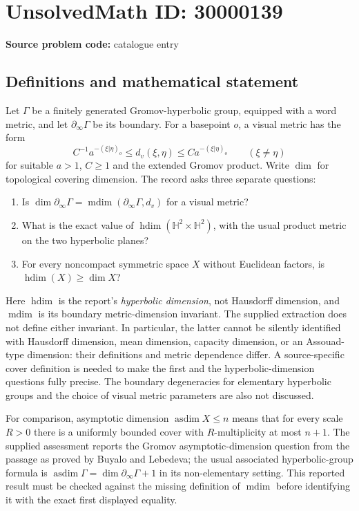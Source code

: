 \documentclass[11pt]{article}
\begin{document}
\section*{UnsolvedMath ID: 30000139}
\textbf{Source problem code:} catalogue entry
\subsection{Definitions and mathematical statement}
Let $\Gamma$ be a finitely generated Gromov-hyperbolic group, equipped with a word metric, and let $\partial_\infty\Gamma$ be its boundary. For a basepoint $o$, a visual metric has the form
\[
 C^{-1}a^{-(\xi|\eta)_o}\leq d_v(\xi,\eta)
       \leq Ca^{-(\xi|\eta)_o}\qquad(\xi\ne\eta)
\]
for suitable $a>1$, $C\geq1$ and the extended Gromov product. Write $\dim$ for topological covering dimension. The record asks three separate questions:
\begin{enumerate}
\item Is $\dim\partial_\infty\Gamma=\operatorname{mdim}(\partial_\infty\Gamma,d_v)$ for a visual metric?
\item What is the exact value of $\operatorname{hdim}(\mathbb H^2\times\mathbb H^2)$, with the usual product metric on the two hyperbolic planes?
\item For every noncompact symmetric space $X$ without Euclidean factors, is $\operatorname{hdim}(X)\geq\dim X$?
\end{enumerate}
Here $\operatorname{hdim}$ is the report's \emph{hyperbolic dimension}, not Hausdorff dimension, and $\operatorname{mdim}$ is its boundary metric-dimension invariant. The supplied extraction does not define either invariant. In particular, the latter cannot be silently identified with Hausdorff dimension, mean dimension, capacity dimension, or an Assouad-type dimension: their definitions and metric dependence differ. A source-specific cover definition is needed to make the first and the hyperbolic-dimension questions fully precise. The boundary degeneracies for elementary hyperbolic groups and the choice of visual metric parameters are also not discussed.

For comparison, asymptotic dimension $\operatorname{asdim}X\leq n$ means that for every scale $R>0$ there is a uniformly bounded cover with $R$-multiplicity at most $n+1$. The supplied assessment reports the Gromov asymptotic-dimension question from the passage as proved by Buyalo and Lebedeva; the usual associated hyperbolic-group formula is $\operatorname{asdim}\Gamma=\dim\partial_\infty\Gamma+1$ in its non-elementary setting. This reported result must be checked against the missing definition of $\operatorname{mdim}$ before identifying it with the exact first displayed equality.
\end{document}
